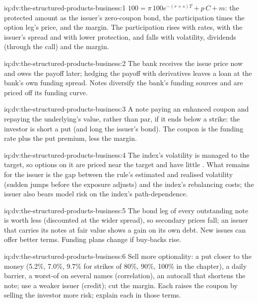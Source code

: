 \begin{solution}{iq:dv:the-structured-products-business:1}
$100=\pi\,100e^{-(r+s)T}+p\,C+m$: the protected amount as the issuer's zero-coupon bond, the participation times the option leg's price, and
the margin. The participation rises with rates, with the issuer's spread and with lower protection, and falls with volatility, dividends
(through the call) and the margin.
\end{solution}

\begin{solution}{iq:dv:the-structured-products-business:2}
The bank receives the issue price now and owes the payoff later; hedging the payoff with derivatives leaves a loan at the bank's own funding
spread. Notes diversify the bank's funding sources and are priced off its funding curve.
\end{solution}

\begin{solution}{iq:dv:the-structured-products-business:3}
A note paying an enhanced coupon and repaying the underlying's value, rather than par, if it ends below a strike: the investor is short a put
(and long the issuer's bond). The coupon is the funding rate plus the put premium, less the margin.
\end{solution}

\begin{solution}{iq:dv:the-structured-products-business:4}
The index's volatility is managed to the target, so options on it are priced near the target and have little . What remains for the issuer
is the gap between the rule's estimated and realised volatility (sudden jumps before the exposure adjusts) and the index's rebalancing costs;
the issuer also bears model risk on the index's path-dependence.
\end{solution}

\begin{solution}{iq:dv:the-structured-products-business:5}
The bond leg of every outstanding note is worth less (discounted at the wider spread), so secondary prices fall; an issuer that carries its notes at
fair value shows a gain on its own debt. New issues can offer better terms. Funding plans change if buy-backs rise.
\end{solution}

\begin{solution}{iq:dv:the-structured-products-business:6}
Sell more optionality: a put closer to the money (5.2\%, 7.0\%, 9.7\% for strikes of 80\%, 90\%, 100\% in the chapter), a daily barrier, a worst-of on
several names (correlation), an autocall that shortens the note; use a weaker issuer (credit); cut the margin. Each raises the coupon by selling the
investor more risk; explain each in those terms.
\end{solution}
